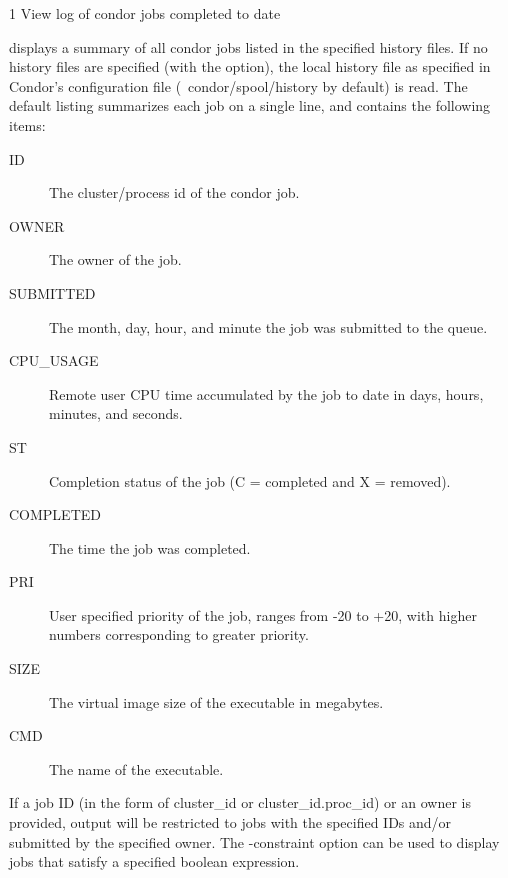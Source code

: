 \begin{ManPage}{\label{man-condor-history}}{1}
{View log of condor jobs completed to date}
\Synopsis {}
  

\Description
{} displays a summary of all condor jobs listed in the
specified history files.  If no history files are specified (with the  option), the local
history file as specified in Condor's configuration file
(~condor/spool/history by default) is read.  The default listing
summarizes each job on a single line, and  contains the following items:


\begin{description}
\item[ID] The cluster/process id of the condor job. 
\item[OWNER] The owner of the job. 
\item[SUBMITTED] The month, day, hour, and minute the job was submitted to the queue. 
\item[CPU\_USAGE] Remote user CPU time accumulated by the job to date in days, hours, minutes, and seconds.
\item[ST] Completion status of the job (C = completed and X = removed).
\item[COMPLETED] The time the job was completed.
\item[PRI] User specified priority of the job, ranges from -20 to +20, with higher numbers corresponding to greater priority. 
\item[SIZE] The virtual image size of the executable in megabytes. 
\item[CMD] The name of the executable. 
\end{description}

If a job ID (in the form of cluster\_id or cluster\_id.proc\_id) or an
owner is provided, output will be restricted to jobs with the
specified IDs and/or submitted by the specified owner.  
The -constraint option can be used to display jobs that satisfy a
specified boolean expression.

\begin{Options}
\end{Options}


\end{ManPage}
